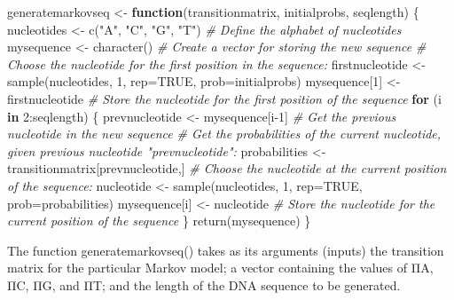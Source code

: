 \documentclass[
]{book}
\newenvironment{Shaded}{\begin{snugshade}}{\end{snugshade}}
\newcommand{\AttributeTok}[1]{\textcolor[rgb]{0.77,0.63,0.00}{#1}}
\newcommand{\CommentTok}[1]{\textcolor[rgb]{0.56,0.35,0.01}{\textit{#1}}}
\newcommand{\ConstantTok}[1]{\textcolor[rgb]{0.00,0.00,0.00}{#1}}
\newcommand{\ControlFlowTok}[1]{\textcolor[rgb]{0.13,0.29,0.53}{\textbf{#1}}}
\newcommand{\DecValTok}[1]{\textcolor[rgb]{0.00,0.00,0.81}{#1}}
\newcommand{\FunctionTok}[1]{\textcolor[rgb]{0.00,0.00,0.00}{#1}}
\newcommand{\NormalTok}[1]{#1}
\newcommand{\OtherTok}[1]{\textcolor[rgb]{0.56,0.35,0.01}{#1}}
\newcommand{\SpecialCharTok}[1]{\textcolor[rgb]{0.00,0.00,0.00}{#1}}
\newcommand{\StringTok}[1]{\textcolor[rgb]{0.31,0.60,0.02}{#1}}
\begin{document}
\begin{Shaded}
\begin{Highlighting}[]
\NormalTok{generatemarkovseq }\OtherTok{\textless{}{-}} \ControlFlowTok{function}\NormalTok{(transitionmatrix, initialprobs, seqlength)}
\NormalTok{\{}
\NormalTok{nucleotides     }\OtherTok{\textless{}{-}} \FunctionTok{c}\NormalTok{(}\StringTok{"A"}\NormalTok{, }\StringTok{"C"}\NormalTok{, }\StringTok{"G"}\NormalTok{, }\StringTok{"T"}\NormalTok{) }\CommentTok{\# Define the alphabet of nucleotides}
\NormalTok{mysequence      }\OtherTok{\textless{}{-}} \FunctionTok{character}\NormalTok{()           }\CommentTok{\# Create a vector for storing the new sequence}
\CommentTok{\# Choose the nucleotide for the first position in the sequence:}
\NormalTok{firstnucleotide }\OtherTok{\textless{}{-}} \FunctionTok{sample}\NormalTok{(nucleotides, }\DecValTok{1}\NormalTok{, }\AttributeTok{rep=}\ConstantTok{TRUE}\NormalTok{, }\AttributeTok{prob=}\NormalTok{initialprobs)}
\NormalTok{mysequence[}\DecValTok{1}\NormalTok{]   }\OtherTok{\textless{}{-}}\NormalTok{ firstnucleotide       }\CommentTok{\# Store the nucleotide for the first position of the sequence}
\ControlFlowTok{for}\NormalTok{ (i }\ControlFlowTok{in} \DecValTok{2}\SpecialCharTok{:}\NormalTok{seqlength)}
\NormalTok{\{}
\NormalTok{prevnucleotide }\OtherTok{\textless{}{-}}\NormalTok{ mysequence[i}\DecValTok{{-}1}\NormalTok{]     }\CommentTok{\# Get the previous nucleotide in the new sequence}
\CommentTok{\# Get the probabilities of the current nucleotide, given previous nucleotide "prevnucleotide":}
\NormalTok{probabilities  }\OtherTok{\textless{}{-}}\NormalTok{ transitionmatrix[prevnucleotide,]}
\CommentTok{\# Choose the nucleotide at the current position of the sequence:}
\NormalTok{nucleotide     }\OtherTok{\textless{}{-}} \FunctionTok{sample}\NormalTok{(nucleotides, }\DecValTok{1}\NormalTok{, }\AttributeTok{rep=}\ConstantTok{TRUE}\NormalTok{, }\AttributeTok{prob=}\NormalTok{probabilities)}
\NormalTok{mysequence[i]  }\OtherTok{\textless{}{-}}\NormalTok{ nucleotide          }\CommentTok{\# Store the nucleotide for the current position of the sequence}
\NormalTok{\}}
\FunctionTok{return}\NormalTok{(mysequence)}
\NormalTok{\}}
\end{Highlighting}
\end{Shaded}

The function generatemarkovseq() takes as its arguments (inputs) the transition matrix for the particular Markov model; a vector containing the values of ΠA, ΠC, ΠG, and ΠT; and the length of the DNA sequence to be generated.
\end{document}
